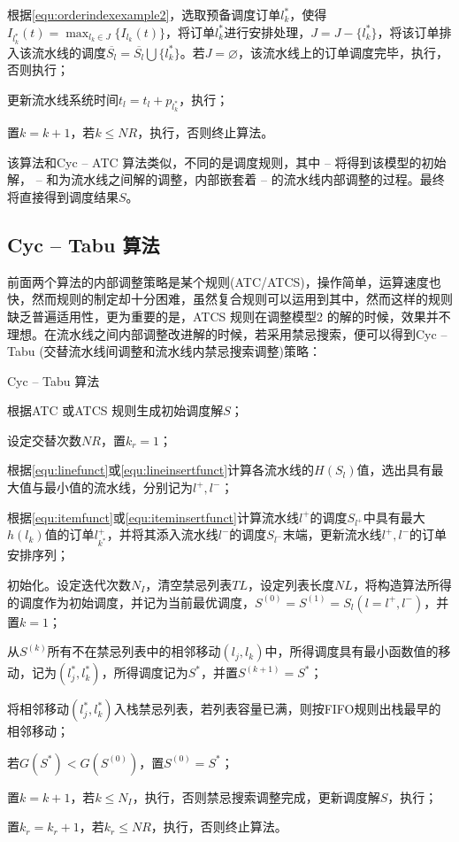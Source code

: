 \begin{algori}
\begin{asparaenum}
\item 根据\eqref{equ:orderindexexample2}，选取预备调度订单$l_k^*$，使得$I_{l_k^*}(t) = \displaystyle\max_{l_k\in J}\{I_{l_k}(t)\}$，将订单$l_k^*$进行安排处理，$J = J -\{l_k^*\}$，将该订单排入该流水线的调度$\overline{S_l} = \overline{S_l}\bigcup \{l_k^*\} $。若$J = \varnothing$，该流水线上的订单调度完毕，执行，否则执行；
\item 更新流水线系统时间$t_l = t_l + p_{l_k^*}$，执行；
\item 置$k = k+1$，若$k\le NR$，执行，否则终止算法。
\end{asparaenum}
\end{algori}

该算法和Cyc -- ATC 算法类似，不同的是调度规则，其中 -- 将得到该模型的初始解， -- 和为流水线之间解的调整，内部嵌套着 -- 的流水线内部调整的过程。最终将直接得到调度结果$S$。
\subsection{Cyc -- Tabu 算法}
前面两个算法的内部调整策略是某个规则(ATC/ATCS)，操作简单，运算速度也快，然而规则的制定却十分困难，虽然复合规则可以运用到其中，然而这样的规则缺乏普遍适用性，更为重要的是，ATCS 规则在调整模型2 的解的时候，效果并不理想。在流水线之间内部调整改进解的时候，若采用禁忌搜索，便可以得到Cyc -- Tabu (交替流水线间调整和流水线内禁忌搜索调整)策略：
\begin{algori}
Cyc -- Tabu 算法\label{alg:cyctabu}
\begin{asparaenum}
\renewcommand{\labelenumi}{\bf Step\theenumi~}
\item 根据ATC 或ATCS 规则生成初始调度解$S$；
\item 设定交替次数$NR$，置$k_r = 1$；
\item 根据\eqref{equ:linefunct}或\eqref{equ:lineinsertfunct}计算各流水线的$H(S_l)$值，选出具有最大值与最小值的流水线，分别记为$l^+, l^-$；
\item 根据\eqref{equ:itemfunct}或\eqref{equ:iteminsertfunct}计算流水线$l^+$的调度$S_{l^+}$中具有最大$h(l_k)$值的订单$l^+_{k^*}$，并将其添入流水线$l^-$的调度$S_{l^-}$末端，更新流水线$l^+, l^-$的订单安排序列；
\item 初始化。设定迭代次数$N_I$，清空禁忌列表$TL$，设定列表长度$NL$，将构造算法所得的调度作为初始调度，并记为当前最优调度，$S^{(0)} = S^{(1)} = S_l(l = l^+, l^-)$，并置$k = 1$；
\item 从$S^{(k)}$所有不在禁忌列表中的相邻移动$(l_j,l_k)$中，所得调度具有最小函数值的移动，记为$(l_j^*, l_k^*)$，所得调度记为$S^*$，并置$S^{(k+1)} = S^*$；
\item 将相邻移动$(l_j^*, l_k^*)$入栈禁忌列表，若列表容量已满，则按FIFO规则出栈最早的相邻移动；
\item 若$G(S^*) < G(S^{(0)})$，置$S^{(0)} = S^*$；
\item 置$k = k + 1$，若$k\le N_I$，执行，否则禁忌搜索调整完成，更新调度解$S$，执行；
\item 置$k_r = k_r + 1$，若$k_r\le NR$，执行，否则终止算法。
\end{asparaenum}
\end{algori}

